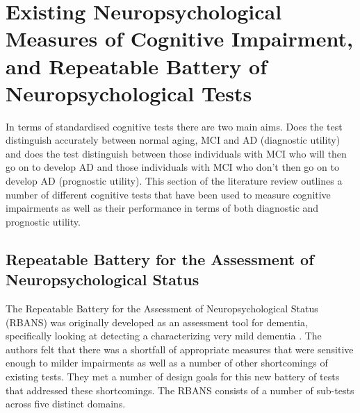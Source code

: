 \documentclass[10pt, letterpaper, twoside, openany]{book}
\begin{document}
\section{Existing Neuropsychological Measures of Cognitive Impairment, and Repeatable Battery of Neuropsychological Tests}
In terms of standardised cognitive tests there are two main aims. Does the test distinguish accurately between normal aging, MCI and AD (diagnostic utility) and does the test distinguish between those individuals with MCI who will then go on to develop AD and those individuals with MCI who don't then go on to develop AD (prognostic utility). This section of the literature review outlines a number of different cognitive tests that have been used to measure cognitive impairments as well as their performance in terms of both diagnostic and prognostic utility.
\par 
\subsection{Repeatable Battery for the Assessment of Neuropsychological Status}
The Repeatable Battery for the Assessment of Neuropsychological Status (RBANS) was originally developed as an assessment tool for dementia, specifically looking at detecting a characterizing very mild dementia \cite{Randolph1998}. The authors felt that there was a shortfall of appropriate measures that were sensitive enough to milder impairments as well as a number of other shortcomings of existing tests. They met a number of design goals for this new battery of tests that addressed these shortcomings. The RBANS consists of a number of sub-tests across five distinct domains.
\end{document}
